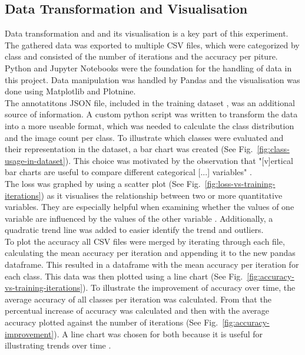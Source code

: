 \subsection{Data Transformation and Visualisation}
Data transformation and and its visualisation is a key part of this experiment. The gathered data was exported to multiple CSV files, 
which were categorized by class and consisted of the number of iterations and the accuracy per piture. Python and Jupyter Notebooks were the
foundation for the handling of data in this project. Data manipulation was handled by Pandas and the visualisation was done using Matplotlib
and Plotnine.\\
The annotatitons JSON file, included in the training dataset \parencite{pascal2023}, was an additional source of information. 
A custom python script was written to transform the data into a more useable format, which was needed to calculate the class distribution 
and the image count per class. To illustrate which classes were evaluated and their representation in the dataset, a bar chart was created 
(See Fig.~\ref{fig:class-usage-in-dataset}). This choice was motivated by the observation that "[v]ertical bar charts are useful to compare 
different categorical [...] variables" \parencite{Statistics-Canada2021}.\\
The loss was graphed by using a scatter plot (See Fig.~\ref{fig:loss-vs-training-iterations})
as it visualises the relationship between two or more quantitative variables. They are especially helpful when examining whether
the values of one variable are influenced by the values of the other variable \parencite{Statistics-Canada2021b}. 
Additionally, a quadratic trend line was added to easier identify the trend and outliers.\\
To plot the accuracy all CSV files were merged by iterating through each file, calculating the mean accuracy per iteration and appending it
to the new pandas dataframe. This resulted in a dataframe with the mean accuracy per iteration for each class. This data was then plotted using
a line chart (See Fig.~\ref{fig:accuracy-vs-training-iterations}).
To illustrate the improvement of accuracy over time, the average accuracy of all classes per iteration was calculated.
From that the percentual increase of accuracy was calculated and then with the average accuracy plotted against the number of iterations
(See Fig.~\ref{fig:accuracy-improvement}).
A line chart was chosen for both because it is useful for illustrating trends over time \parencite{Statistics-Canada2021a}.\\

